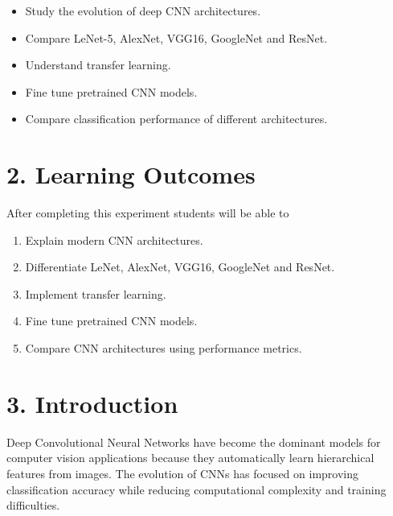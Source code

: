 \documentclass[11pt]{article}
\begin{document}
\begin{itemize}

\item Study the evolution of deep CNN architectures.

\item Compare LeNet-5, AlexNet, VGG16, GoogleNet and ResNet.

\item Understand transfer learning.

\item Fine tune pretrained CNN models.

\item Compare classification performance of different architectures.

\end{itemize}


\section*{2. Learning Outcomes}

After completing this experiment students will be able to

\begin{enumerate}

\item Explain modern CNN architectures.

\item Differentiate LeNet, AlexNet, VGG16, GoogleNet and ResNet.

\item Implement transfer learning.

\item Fine tune pretrained CNN models.

\item Compare CNN architectures using performance metrics.

\end{enumerate}


\section*{3. Introduction}

Deep Convolutional Neural Networks have become the dominant models for
computer vision applications because they automatically learn hierarchical
features from images. The evolution of CNNs has focused on improving
classification accuracy while reducing computational complexity and
training difficulties.
\end{document}
